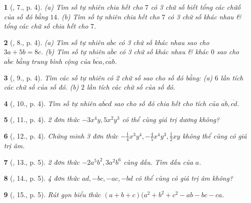 \documentclass{article}
\newtheorem{baitoan}{}
\begin{document}
\begin{baitoan}[\cite{Binh_Toan_8_tap_1}, 7., p. 4]
	(a) Tìm số tự nhiên chia hết cho $7$ có 3 chữ số biết tổng các chữố của số đó bằng $14$. (b) Tìm số tự nhiên chia hết cho $7$ có 3 chữ số khác nhau \& tổng các chữ số chia hết cho $7$.
\end{baitoan}

\begin{baitoan}[\cite{Binh_Toan_8_tap_1}, 8., p. 4]
	(a) Tìm số tự nhiên $\overline{abc}$ có 3 chữ số khác nhau sao cho $3a + 5b = 8c$. (b) Tìm số tự nhiên $\overline{abc}$ có 3 chữ số khác nhau \& khác $0$ sao cho $\overline{abc}$ bằng trung bình cộng của $\overline{bca},\overline{cab}$.
\end{baitoan}

\begin{baitoan}[\cite{Binh_Toan_8_tap_1}, 9., p. 4]
	Tìm các số tự nhiên có 2 chữ số sao cho số đó bằng: (a) $6$ lần tích các chữ số của số đó. (b) $2$ lần tích các chữ số của số đó.
\end{baitoan}

\begin{baitoan}[\cite{Binh_Toan_8_tap_1}, 10., p. 4]
	Tìm số tự nhiên $\overline{abcd}$ sao cho số đó chia hết cho tích của $\overline{ab},\overline{cd}$.
\end{baitoan}

\begin{baitoan}[\cite{Binh_Toan_8_tap_1}, 11., p. 4]
	2 đơn thức $-3x^4y,5x^2y^3$ có thể cùng giá trị dương không?
\end{baitoan}

\begin{baitoan}[\cite{Binh_Toan_8_tap_1}, 12., p. 4]
	Chứng minh 3 đơn thức $-\frac{1}{4}x^3y^4,-\frac{4}{5}x^4y^3,\frac{1}{2}xy$ không thể cùng có giá trị âm.
\end{baitoan}

\begin{baitoan}[\cite{Binh_Toan_8_tap_1}, 13., p. 5]
	2 đơn thức $-2a^5b^2,3a^2b^6$ cùng dấu. Tìm dấu của $a$.
\end{baitoan}

\begin{baitoan}[\cite{Binh_Toan_8_tap_1}, 14., p. 5]
	4 đơn thức $ad,-bc,-ac,-bd$ có thể cùng có giá trị âm không?
\end{baitoan}

\begin{baitoan}[\cite{Binh_Toan_8_tap_1}, 15., p. 5]
	Rút gọn biểu thức $(a + b + c)(a^2 + b^2 + c^2 - ab - bc - ca$.
\end{baitoan}
\end{document}
